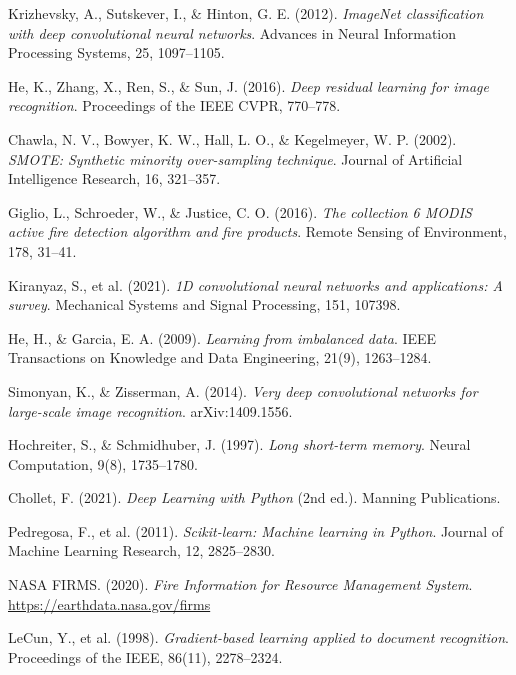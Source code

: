 \documentclass[12pt,a4paper]{report}
\begin{document}
\begin{enumerate}[leftmargin=1.5cm, label={[\arabic*]}]

    \item Krizhevsky, A., Sutskever, I., \& Hinton, G. E. (2012). \textit{ImageNet classification with deep convolutional neural networks}. Advances in Neural Information Processing Systems, 25, 1097--1105.

    \item He, K., Zhang, X., Ren, S., \& Sun, J. (2016). \textit{Deep residual learning for image recognition}. Proceedings of the IEEE CVPR, 770--778.

    \item Chawla, N. V., Bowyer, K. W., Hall, L. O., \& Kegelmeyer, W. P. (2002). \textit{SMOTE: Synthetic minority over-sampling technique}. Journal of Artificial Intelligence Research, 16, 321--357.

    \item Giglio, L., Schroeder, W., \& Justice, C. O. (2016). \textit{The collection 6 MODIS active fire detection algorithm and fire products}. Remote Sensing of Environment, 178, 31--41.

    \item Kiranyaz, S., et al. (2021). \textit{1D convolutional neural networks and applications: A survey}. Mechanical Systems and Signal Processing, 151, 107398.

    \item He, H., \& Garcia, E. A. (2009). \textit{Learning from imbalanced data}. IEEE Transactions on Knowledge and Data Engineering, 21(9), 1263--1284.

    \item Simonyan, K., \& Zisserman, A. (2014). \textit{Very deep convolutional networks for large-scale image recognition}. arXiv:1409.1556.

    \item Hochreiter, S., \& Schmidhuber, J. (1997). \textit{Long short-term memory}. Neural Computation, 9(8), 1735--1780.

    \item Chollet, F. (2021). \textit{Deep Learning with Python} (2nd ed.). Manning Publications.

    \item Pedregosa, F., et al. (2011). \textit{Scikit-learn: Machine learning in Python}. Journal of Machine Learning Research, 12, 2825--2830.

    \item NASA FIRMS. (2020). \textit{Fire Information for Resource Management System}. \url{https://earthdata.nasa.gov/firms}

    \item LeCun, Y., et al. (1998). \textit{Gradient-based learning applied to document recognition}. Proceedings of the IEEE, 86(11), 2278--2324.

\end{enumerate}
\end{document}
